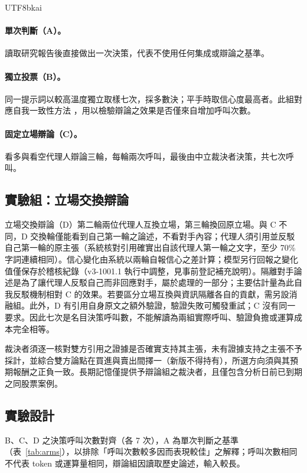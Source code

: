 \documentclass[12pt,a4paper]{article}
\newcommand{\grp}[1]{\textsf{#1}}
\begin{document}
\begin{CJK}{UTF8}{bkai}
\paragraph{單次判斷（\grp{A}）。}
讀取研究報告後直接做出一次決策，代表不使用任何集成或辯論之基準。

\paragraph{獨立投票（\grp{B}）。}
同一提示詞以較高溫度獨立取樣七次，採多數決；平手時取信心度最高者。此組對應自我一致性方法 \citep{wang2023selfconsistency}，用以檢驗辯論之效果是否僅來自增加呼叫次數。

\paragraph{固定立場辯論（\grp{C}）。}
看多與看空代理人辯論三輪，每輪兩次呼叫，最後由中立裁決者決策，共七次呼叫。

\subsection{實驗組：立場交換辯論}

立場交換辯論（\grp{D}）第二輪兩位代理人互換立場，第三輪換回原立場。與 \grp{C} 不同，\grp{D} 交換輪僅能看到自己第一輪之論述，不看對手內容；代理人須引用並反駁自己第一輪的原主張（系統核對引用確實出自該代理人第一輪之文字，至少 70\% 字詞連續相同）。信心變化由系統以兩輪自報信心之差計算；模型另行回報之變化值僅保存於稽核紀錄（v3-1001.1 執行中調整，見事前登記補充說明）。隔離對手論述是為了讓代理人反駁自己而非回應對手，屬於處理的一部分；主要估計量為此自我反駁機制相對 \grp{C} 的效果。若要區分立場互換與資訊隔離各自的貢獻，需另設消融組。此外，\grp{D} 有引用自身原文之額外驗證，驗證失敗可觸發重試；\grp{C} 沒有同一要求。因此七次是名目決策呼叫數，不能解讀為兩組實際呼叫、驗證負擔或運算成本完全相等。

裁決者須逐一核對雙方引用之證據是否確實支持其主張，未有證據支持之主張不予採計，並綜合雙方論點在買進與賣出間擇一（新版不得持有），所選方向須與其預期報酬之正負一致。長期記憶僅提供予辯論組之裁決者，且僅包含分析日前已到期之同股票案例。

\subsection{實驗設計}

\grp{B}、\grp{C}、\grp{D} 之決策呼叫次數對齊（各 7 次），\grp{A} 為單次判斷之基準（表~\ref{tab:arms}），以排除「呼叫次數較多因而表現較佳」之解釋；呼叫次數相同不代表 token 或運算量相同，辯論組因讀取歷史論述，輸入較長。


\end{CJK}
\end{document}
